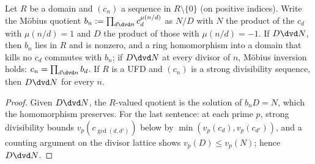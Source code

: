 \begin{lemma}
  \label{lem:moebiusfactor}
  \leanok
  Let $R$ be a domain and $(c_n)$ a sequence in $R \setminus \{0\}$ (on positive indices). Write
  the Möbius quotient $b_n := \prod_{d \dvd n} c_d^{\mu(n/d)}$ as $N/D$ with $N$ the product of the
  $c_d$ with $\mu(n/d) = 1$ and $D$ the product of those with $\mu(n/d) = -1$. If $D \dvd N$, then
  $b_n$ lies in $R$ and is nonzero, and a ring homomorphism into a domain that kills no $c_d$
  commutes with $b_n$; if $D \dvd N$ at every divisor of $n$, Möbius inversion holds:
  $c_n = \prod_{d \dvd n} b_d$. If $R$ is a UFD and $(c_n)$ is a strong divisibility sequence,
  then $D \dvd N$ for every $n$.
\end{lemma}
\begin{proof}
  \leanok
  Given $D \dvd N$, the $R$-valued quotient is the solution of $b_n D = N$, which the
  homomorphism preserves. For the last sentence: at each prime $p$, strong divisibility bounds
  $v_p(c_{\gcd(d,d')})$ below by $\min(v_p(c_d), v_p(c_{d'}))$, and a counting argument on the
  divisor lattice shows $v_p(D) \le v_p(N)$; hence $D \dvd N$.
\end{proof}

